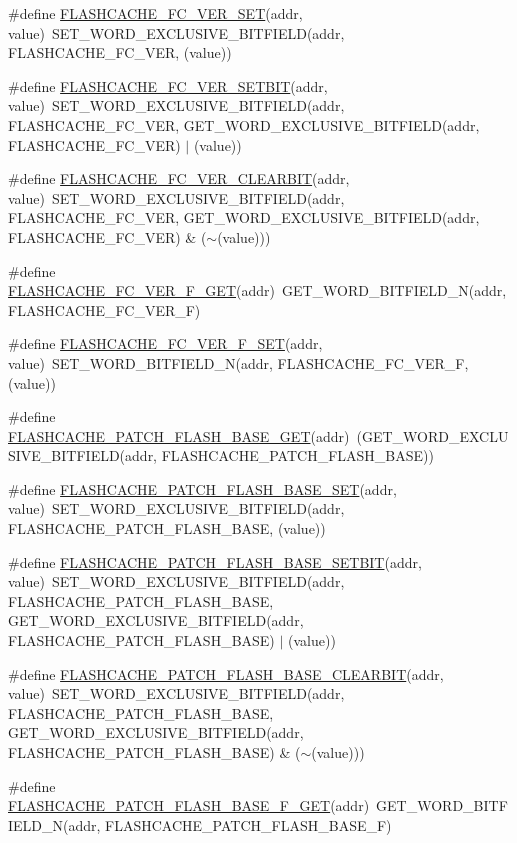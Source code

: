 \begin{DoxyCompactItemize}
\item 
\#define \hyperlink{a00549_a354b66c4f96849f9ed9356111e2316bf}{FLASHCACHE\_\-FC\_\-VER\_\-SET}(addr, value)~SET\_\-WORD\_\-EXCLUSIVE\_\-BITFIELD(addr, FLASHCACHE\_\-FC\_\-VER, (value))
\item 
\#define \hyperlink{a00549_a8e156d09659bd4b7f12d1742a477c3ee}{FLASHCACHE\_\-FC\_\-VER\_\-SETBIT}(addr, value)~SET\_\-WORD\_\-EXCLUSIVE\_\-BITFIELD(addr, FLASHCACHE\_\-FC\_\-VER, GET\_\-WORD\_\-EXCLUSIVE\_\-BITFIELD(addr, FLASHCACHE\_\-FC\_\-VER) $|$ (value))
\item 
\#define \hyperlink{a00549_ae3806498e9b1fb2b0950d08b9c526ee7}{FLASHCACHE\_\-FC\_\-VER\_\-CLEARBIT}(addr, value)~SET\_\-WORD\_\-EXCLUSIVE\_\-BITFIELD(addr, FLASHCACHE\_\-FC\_\-VER, GET\_\-WORD\_\-EXCLUSIVE\_\-BITFIELD(addr, FLASHCACHE\_\-FC\_\-VER) \& ($\sim$(value)))
\item 
\#define \hyperlink{a00549_ab50aa8b21007f206e830c93e48042699}{FLASHCACHE\_\-FC\_\-VER\_\-F\_\-GET}(addr)~GET\_\-WORD\_\-BITFIELD\_\-N(addr, FLASHCACHE\_\-FC\_\-VER\_\-F)
\item 
\#define \hyperlink{a00549_a063bcd97751f9fc785fb99a5fdda554d}{FLASHCACHE\_\-FC\_\-VER\_\-F\_\-SET}(addr, value)~SET\_\-WORD\_\-BITFIELD\_\-N(addr, FLASHCACHE\_\-FC\_\-VER\_\-F, (value))
\item 
\#define \hyperlink{a00549_a4e3777a1731e1154e1a905a4c490da44}{FLASHCACHE\_\-PATCH\_\-FLASH\_\-BASE\_\-GET}(addr)~(GET\_\-WORD\_\-EXCLUSIVE\_\-BITFIELD(addr, FLASHCACHE\_\-PATCH\_\-FLASH\_\-BASE))
\item 
\#define \hyperlink{a00549_adfb4e5c93eeb7030d807c6439afb0865}{FLASHCACHE\_\-PATCH\_\-FLASH\_\-BASE\_\-SET}(addr, value)~SET\_\-WORD\_\-EXCLUSIVE\_\-BITFIELD(addr, FLASHCACHE\_\-PATCH\_\-FLASH\_\-BASE, (value))
\item 
\#define \hyperlink{a00549_affe7462de73b4fd1b6857bd36658598f}{FLASHCACHE\_\-PATCH\_\-FLASH\_\-BASE\_\-SETBIT}(addr, value)~SET\_\-WORD\_\-EXCLUSIVE\_\-BITFIELD(addr, FLASHCACHE\_\-PATCH\_\-FLASH\_\-BASE, GET\_\-WORD\_\-EXCLUSIVE\_\-BITFIELD(addr, FLASHCACHE\_\-PATCH\_\-FLASH\_\-BASE) $|$ (value))
\item 
\#define \hyperlink{a00549_ade3aec9f15bcbc28ed5a129e70f2fc71}{FLASHCACHE\_\-PATCH\_\-FLASH\_\-BASE\_\-CLEARBIT}(addr, value)~SET\_\-WORD\_\-EXCLUSIVE\_\-BITFIELD(addr, FLASHCACHE\_\-PATCH\_\-FLASH\_\-BASE, GET\_\-WORD\_\-EXCLUSIVE\_\-BITFIELD(addr, FLASHCACHE\_\-PATCH\_\-FLASH\_\-BASE) \& ($\sim$(value)))
\item 
\#define \hyperlink{a00549_aa0569855978aa6d685a687c4fde26777}{FLASHCACHE\_\-PATCH\_\-FLASH\_\-BASE\_\-F\_\-GET}(addr)~GET\_\-WORD\_\-BITFIELD\_\-N(addr, FLASHCACHE\_\-PATCH\_\-FLASH\_\-BASE\_\-F)

\end{DoxyCompactItemize}
